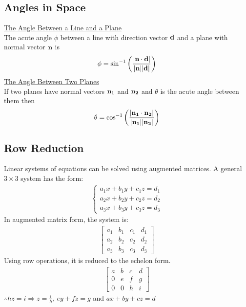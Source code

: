 \documentclass[10pt, a4paper, titlepage]{article}
\begin{document}
\begin{multicols*}{3}
	\subsection{Angles in Space}
	\underline{The Angle Between a Line and a Plane}\\
	The acute angle $\phi$ between a line with direction vector $\vb{d}$ and a plane with normal vector $\vb{n}$ is
	\begin{align}
		\phi=\sin^{-1}{\left(\frac{|\vb{n}\cdot\vb{d}|}{|\vb{n}||\vb{d}|}\right)}
	\end{align}
	\underline{The Angle Between Two Planes}\\
	If two planes have normal vectors $\vb{n_1}$ and $\vb{n_2}$ and $\theta$ is the acute angle between them then
	\begin{align}
		\theta=\cos^{-1}{\left(\frac{|\vb{n_1}\cdot\vb{n_2}|}{|\vb{n_1}||\vb{n_2}|}\right)}
	\end{align}

	\dotfill
	\subsection{Row Reduction}
	Linear systems of equations can be solved using augmented matrices. A general $3\times 3$ system has the form:
	\begin{align}
		\begin{cases}
			a_1x+b_1y+c_1z=d_1\\
			a_2x+b_2y+c_2z=d_2\\
			a_3x+b_3y+c_3z=d_3
		\end{cases}
	\end{align}
	In augmented matrix form, the system is:
	\begin{align}
		\left[
			\begin{array}{ccc|c}
				a_1 & b_1 & c_1 & d_1\\
				a_2 & b_2 & c_2 & d_2\\
				a_3 & b_3 & c_3 & d_3
			\end{array}
		\right]
	\end{align}
	Using row operations, it is reduced to the echelon form.
	\begin{align}
		\left[
			\begin{array}{ccc|c}
				a & b & c & d\\
				0 & e & f & g\\
				0 & 0 & h & i
			\end{array}
		\right]
	\end{align}
	$\therefore hz=i\Rightarrow z=\frac{i}{h}$, $ey+fz=g$ and $ax+by+cz=d$


\end{multicols*}
\end{document}
